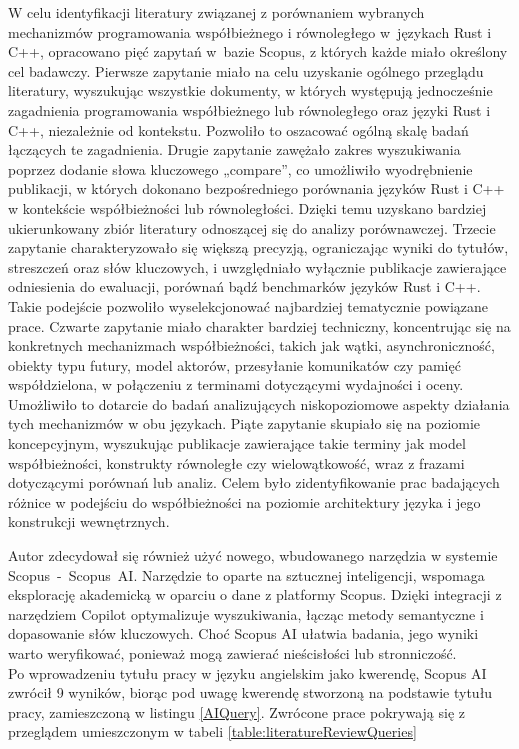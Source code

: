 W celu identyfikacji literatury związanej z porównaniem wybranych mechanizmów programowania współbieżnego i równoległego w~językach Rust i C++, opracowano pięć zapytań w~bazie Scopus, z których każde miało określony cel badawczy. Pierwsze zapytanie miało na celu uzyskanie ogólnego przeglądu literatury, wyszukując wszystkie dokumenty, w których występują jednocześnie zagadnienia programowania współbieżnego lub równoległego oraz języki Rust i C++, niezależnie od kontekstu. Pozwoliło to oszacować ogólną skalę badań łączących te zagadnienia. Drugie zapytanie zawężało zakres wyszukiwania poprzez dodanie słowa kluczowego „compare”, co umożliwiło wyodrębnienie publikacji, w których dokonano bezpośredniego porównania języków Rust i C++ w kontekście współbieżności lub równoległości. Dzięki temu uzyskano bardziej ukierunkowany zbiór literatury odnoszącej się do analizy porównawczej. Trzecie zapytanie charakteryzowało się większą precyzją, ograniczając wyniki do tytułów, streszczeń oraz słów kluczowych, i uwzględniało wyłącznie publikacje zawierające odniesienia do ewaluacji, porównań bądź benchmarków języków Rust i C++. Takie podejście pozwoliło wyselekcjonować najbardziej tematycznie powiązane prace. Czwarte zapytanie miało charakter bardziej techniczny, koncentrując się na konkretnych mechanizmach współbieżności, takich jak wątki, asynchroniczność, obiekty typu futury, model aktorów, przesyłanie komunikatów czy pamięć współdzielona, w połączeniu z terminami dotyczącymi wydajności i oceny. Umożliwiło to dotarcie do badań analizujących niskopoziomowe aspekty działania tych mechanizmów w obu językach. Piąte zapytanie skupiało się na poziomie koncepcyjnym, wyszukując publikacje zawierające takie terminy jak model współbieżności, konstrukty równoległe czy wielowątkowość, wraz z frazami dotyczącymi porównań lub analiz. Celem było zidentyfikowanie prac badających różnice w podejściu do współbieżności na poziomie architektury języka i jego konstrukcji wewnętrznych.

Autor zdecydował się również użyć nowego, wbudowanego narzędzia w systemie \mbox{Scopus - Scopus AI}. Narzędzie to oparte na sztucznej inteligencji, wspomaga eksplorację akademicką w oparciu o dane z platformy Scopus. Dzięki integracji z narzędziem Copilot optymalizuje wyszukiwania, łącząc metody semantyczne i dopasowanie słów kluczowych. Choć Scopus AI ułatwia badania, jego wyniki warto weryfikować, ponieważ mogą zawierać nieścisłości lub stronniczość. \\
Po wprowadzeniu tytułu pracy w języku angielskim jako kwerendę, Scopus AI zwrócił 9 wyników, biorąc pod uwagę kwerendę stworzoną na podstawie tytułu pracy, zamieszczoną w listingu \ref{AIQuery}. Zwrócone prace pokrywają się z przeglądem umieszczonym w tabeli \ref{table:literatureReviewQueries} 

